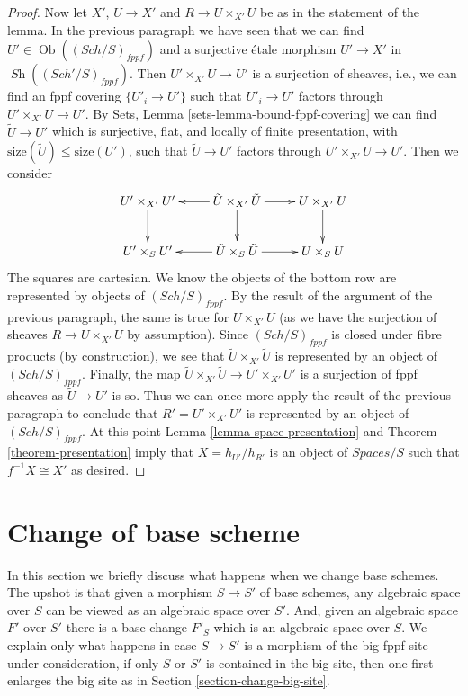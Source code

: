 \documentclass{stacks-project}
\theoremstyle{plain}
\theoremstyle{definition}
\theoremstyle{remark}
\numberwithin{equation}{subsection}
\def\Sch{\mathit{Sch}}
\def\Ob{\mathop{\mathrm{Ob}}\nolimits}
\def\Sh{\mathop{\mathit{Sh}}\nolimits}
\begin{document}
\begin{proof}
\medskip\noindent
Now let $X'$, $U \to X'$ and $R \to U \times_{X'} U$ be as in the
statement of the lemma. In the previous paragraph we have seen that
we can find $U' \in \Ob((\Sch/S)_{fppf})$ and a surjective \'etale morphism
$U' \to X'$ in $\Sh((\Sch'/S)_{fppf})$. Then
$U' \times_{X'} U \to U'$ is a surjection of sheaves, i.e., we can find an fppf
covering $\{U'_i \to U'\}$ such that $U'_i \to U'$ factors through
$U' \times_{X'} U \to U'$.
By Sets, Lemma \ref{sets-lemma-bound-fppf-covering}
we can find
$\tilde U \to U'$
which is surjective, flat, and locally of finite presentation,
with $\text{size}(\tilde U) \leq \text{size}(U')$,
such that $\tilde U \to U'$ factors through
$U' \times_{X'} U \to U'$. Then we consider
$$
\xymatrix{
U' \times_{X'} U' \ar[d] &
\tilde U \times_{X'} \tilde U  \ar[l] \ar[d] \ar[r] &
U \times_{X'} U \ar[d] \\
U' \times_S U' & \tilde U \times_S \tilde U \ar[l] \ar[r] & U \times_S U
}
$$
The squares are cartesian. We know the objects of the bottom row
are represented by objects of $(\Sch/S)_{fppf}$. By the result of the
argument of the previous paragraph, the same is true for $U \times_{X'} U$
(as we have the surjection of sheaves $R \to U \times_{X'} U$
by assumption). Since $(\Sch/S)_{fppf}$ is closed under fibre
products (by construction), we see that $\tilde U \times_{X'} \tilde U$
is represented by an object of $(\Sch/S)_{fppf}$. Finally, the
map $\tilde U \times_{X'} \tilde U \to U' \times_{X'} U'$ is
a surjection of fppf sheaves as $\tilde U \to U'$ is so.
Thus we can once more apply the result of the previous paragraph
to conclude that $R' = U' \times_{X'} U'$ is represented by an object
of $(\Sch/S)_{fppf}$. At this point
Lemma \ref{lemma-space-presentation} and
Theorem \ref{theorem-presentation} imply that $X = h_{U'}/h_{R'}$
is an object of $\textit{Spaces}/S$ such that $f^{-1}X \cong X'$
as desired.
\end{proof}



\section{Change of base scheme}
\label{section-change-base-scheme}

\noindent
In this section we briefly discuss what happens when we change base schemes.
The upshot is that given a morphism $S \to S'$ of base schemes, any algebraic
space over $S$ can be viewed as an algebraic space over $S'$. And, given an
algebraic space $F'$ over $S'$ there is a base change $F'_S$ which is
an algebraic space over $S$.
We explain only what happens in case $S \to S'$ is a morphism of the
big fppf site under consideration, if only $S$ or $S'$ is contained in the
big site, then one first enlarges the big site as in
Section \ref{section-change-big-site}.
\end{document}
